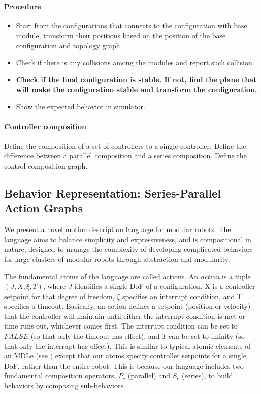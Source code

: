 \documentclass[conference]{IEEEtran}
\theoremstyle{definition}
\begin{document}
\paragraph{Procedure}
\begin{itemize}
\item Start from the configurations that connects to the configuration with base module, transform their positions based on the position of the base configuration and topology graph.
\item Check if there is any collisions among the modules and report such collision.
\item \textbf{Check if the final configuration is stable. If not, find the plane that will make the configuration stable and transform the configuration.}
\item Show the expected behavior in simulator.
\end{itemize}

\paragraph{Controller composition}
Define the composition of a set of controllers to a single controller. Define the difference between a parallel composition and a series composition. Define the control composition graph.

\subsection{Behavior Representation: Series-Parallel Action Graphs}
\label{sec:behavior-representation}
We present a novel motion description language for modular robots.  The
language aims to balance simplicity and expressiveness, and is compositional in
nature, designed to manage the complexity of developing complicated behaviors
for large clusters of modular robots through abstraction and modularity.

The fundamental atoms of the language are called actions.  An \textit{action} is a tuple \(
(J, X, \xi, T)\), where \(J\) identifies a single DoF of a configuration, X is a
controller setpoint for that degree of freedom, \(\xi\) specifies an interrupt
condition, and T specifies a timeout.  Basically, an action defines a setpoint
(position or velocity) that the controller will maintain until either the
interrupt condition is met or time runs out, whichever comes first.  The
interrupt condition can be set to \(FALSE\) (so that only the timeout has effect),
and \(T\) can be set to infinity (so that only the interrupt has effect).  This is
similar to typical atomic elements of an MDLe (see \cite{hristu2003motion}) except that our
atoms specify controller setpoints for a single DoF, rather than the entire
robot.  This is because our language includes two fundamental composition operators,
\(P_c\) (parallel) and \(S_c\) (series), to build behaviors by composing sub-behaviors.
\end{document}

